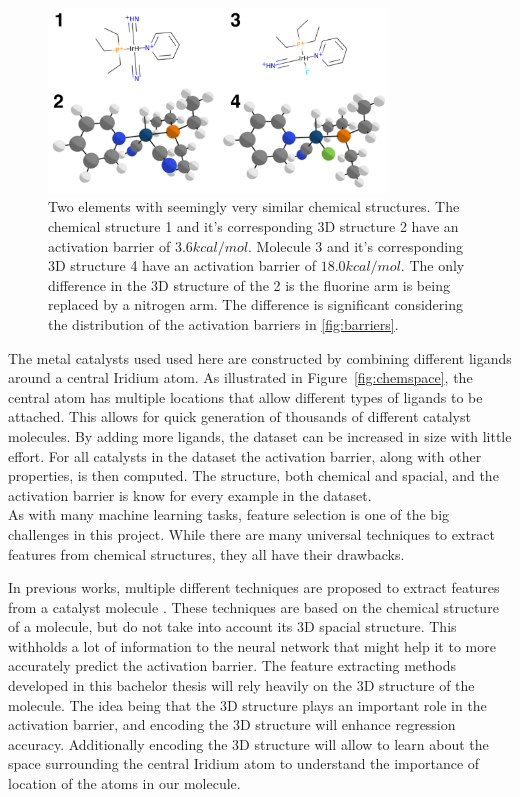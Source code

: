 \begin{figure}
  \centering
  \includegraphics[width=0.8\textwidth]{figures/introduction/elems_intro.png}
  \caption{Two elements with seemingly very similar chemical structures. The chemical structure 1 and it's corresponding 3D structure 2 have an activation barrier of $3.6 kcal/mol$.
  Molecule 3 and it's corresponding 3D structure 4 have an activation barrier of $18.0 kcal/mol$.
  The only difference in the 3D structure of the 2 is the fluorine arm is being replaced by a nitrogen arm.
  The difference is significant considering the distribution of the activation barriers in \ref{fig:barriers}.  }
  \label{fig:struct-diff}
\end{figure}


The metal catalysts used used here are constructed by combining different ligands around a central Iridium atom.
As illustrated in Figure~\ref{fig:chemspace}, the central atom has multiple locations that allow different types of ligands to be attached.  
This allows for quick generation of thousands of different catalyst molecules.
By adding more ligands, the dataset can be increased in size with little effort.
For all catalysts in the dataset the activation barrier, along with other properties, is then computed.
The structure, both chemical and spacial, and the activation barrier is know for every example in the dataset. 
\\
As with many machine learning tasks, feature selection is one of the big challenges in this project.
While there are many universal techniques to extract features from chemical structures, they all have their drawbacks.

In previous works, multiple different techniques are proposed to extract features from a catalyst molecule \cite{friederich_dos}.
These techniques are based on the chemical structure of a molecule, but do not take into account its 3D spacial structure.
This withholds a lot of information to the neural network that might help it to more accurately predict the activation barrier.
The feature extracting methods developed in this bachelor thesis will rely heavily on the 3D structure of the molecule.
The idea being that the 3D structure plays an important role in the activation barrier, and encoding the 3D structure will enhance regression accuracy.
Additionally encoding the 3D structure will allow to learn about the space surrounding the central 
Iridium atom to understand the importance of location of the atoms in our molecule.

